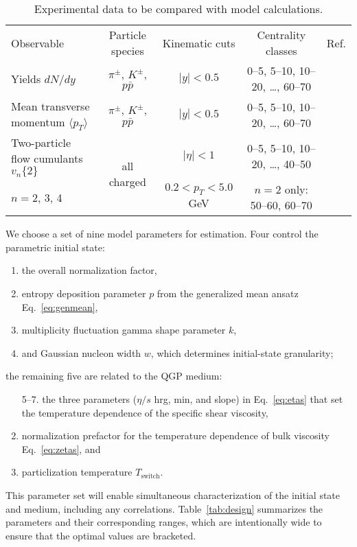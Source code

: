 \documentclass[aps,prc,reprint,amsmath,nofootinbib,superscriptaddress]{revtex4-1}
\newcommand{\avg}[1]{\langle #1 \rangle}
\newcommand{\vnk}[2]{v_#1\{#2\}}
\newcommand{\paddedhline}{\noalign{\smallskip}\hline\noalign{\smallskip}}
\begin{document}
\begin{table*}
  \caption{
    \label{tab:observables}
    Experimental data to be compared with model calculations.
  }
  \begin{ruledtabular}
  \begin{tabular}{lcccc}
    Observable & Particle species & Kinematic cuts & Centrality classes & Ref. \\
    \paddedhline
    Yields $dN/dy$                       & $\pi^\pm$, $K^\pm$, $p\bar p$ &
    $|y| < 0.5$ & 0--5, 5--10, 10--20, \ldots, 60--70 & \cite{Abelev:2013vea} \\
    \noalign{\smallskip}
    Mean transverse momentum $\avg{p_T}$ & $\pi^\pm$, $K^\pm$, $p\bar p$ &
    $|y| < 0.5$ & 0--5, 5--10, 10--20, \ldots, 60--70 & \cite{Abelev:2013vea} \\
    \noalign{\smallskip}
    Two-particle flow cumulants $\vnk n 2$ & \multirow{2}{*}{all charged} &
    $|\eta| < 1$ & 0--5, 5--10, 10--20, \ldots, 40--50 &
    \multirow{2}{*}{\cite{ALICE:2011ab}} \\
    $n = 2$, 3, 4 & & $0.2 < p_T < 5.0$ GeV & $n = 2$ only: 50--60, 60--70 & \\
  \end{tabular}
  \end{ruledtabular}
\end{table*}

We choose a set of nine model parameters for estimation.
Four control the parametric initial state:
\begin{enumerate}[noitemsep]
  \item the overall normalization factor,
  \item entropy deposition parameter $p$ from the generalized mean ansatz Eq.~\eqref{eq:genmean},
  \item multiplicity fluctuation gamma shape parameter $k$,
  \item and Gaussian nucleon width $w$, which determines initial-state granularity;
\end{enumerate}
the remaining five are related to the QGP medium:
\begin{enumerate}[noitemsep]
  \item[5--7.] the three parameters ($\eta/s$ hrg, min, and slope) in Eq.~\eqref{eq:etas} that set the temperature dependence of the specific shear viscosity,
  \setcounter{enumi}{7}
  \item normalization prefactor for the temperature dependence of bulk viscosity Eq.~\eqref{eq:zetas}, and
  \item particlization temperature $T_\text{switch}$.
\end{enumerate}
This parameter set will enable simultaneous characterization of the initial state and medium, including any correlations.
Table~\ref{tab:design} summarizes the parameters and their corresponding ranges, which are intentionally wide to ensure that the optimal values are bracketed.
\end{document}
